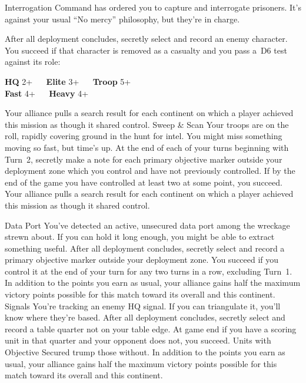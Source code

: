 \noindent%
\covertcard%
{Interrogation}%
{Command has ordered you to capture and interrogate prisoners.  It's
  against your usual ``No mercy'' philosophy, but they're in charge.}%
{After all deployment concludes, secretly select and record an enemy
  character.  You succeed if that character is removed as a casualty
  and you pass a~D6 test against its role:

\bigskip
\begin{minipage}{1.0\linewidth}\centering
\textbf{HQ} 2+ ~~ \textbf{Elite} 3+ ~~ \textbf{Troop} 5+\\
\textbf{Fast} 4+ ~~ \textbf{Heavy} 4+  
\end{minipage}}%
{Your alliance pulls a search result for each continent on which a
  player achieved this mission as though it shared control.}
\hfill%
\covertcard%
{Sweep \& Scan}%
{Your troops are on the roll, rapidly covering ground in the hunt for
  intel.  You might miss something moving so fast, but time's up.}%
{At the end of each of your turns beginning with Turn~2, secretly make
  a note for each primary objective marker outside your deployment
  zone which you control and have not previously controlled.  If by
  the end of the game you have controlled at least two at some point,
  you succeed.}%
{Your alliance pulls a search result for each continent on which a
  player achieved this mission as though it shared control.}

\vfill

\noindent%
\covertcard%
{Data Port}%
{You've detected an active, unsecured data port among the wreckage
  strewn about.  If you can hold it long enough, you might be able to
  extract something useful.}%
{After all deployment concludes, secretly select and record a primary
  objective marker outside your deployment zone.  You succeed if you
  control it at the end of your turn for any two turns in a row,
  excluding Turn~1.}%
{In addition to the points you earn as usual, your alliance gains half
  the maximum victory points possible for this match toward its
  overall and this continent.} \hfill%
\covertcard%
{Signals}%
{You're tracking an enemy HQ signal.  If you can triangulate it,
  you'll know where they're based.}%
{After all deployment concludes, secretly select and record a table
  quarter not on your table edge.  At game end if you have a scoring
  unit in that quarter and your opponent does not, you succeed.  Units
  with Objective Secured trump those without.}%
{In addition to the points you earn as usual, your alliance gains half
  the maximum victory points possible for this match toward its
  overall and this continent.}

\pagebreak
\restorebackground%

